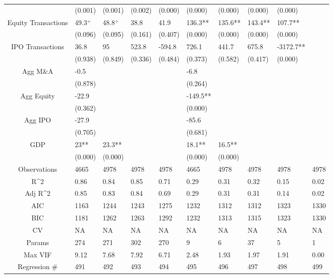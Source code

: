 \documentclass{article}
\begin{document}
\begin{table}[H]
\begin{tabular}{|clllllllll|}
   & (0.001) & (0.001) & (0.002) & (0.000) & (0.000) & (0.000) & (0.000) & (0.000) &  \\ 
  Equity Transactions & 49.3$^{+}$ & 48.8$^{+}$ & 38.8 & 41.9 & 136.3** & 135.6** & 143.4** & 107.7** &  \\ 
   & (0.096) & (0.095) & (0.161) & (0.407) & (0.000) & (0.000) & (0.000) & (0.000) &  \\ 
  IPO Transactions & 36.8 & 95 & 523.8 & -594.8 & 726.1 & 441.7 & 675.8 & -3172.7** &  \\ 
   & (0.938) & (0.849) & (0.336) & (0.484) & (0.373) & (0.582) & (0.417) & (0.000) &  \\ 
  Agg M\&A & -0.5 &  &  &  & -6.8 &  &  &  &  \\ 
   & (0.878) &  &  &  & (0.264) &  &  &  &  \\ 
  Agg Equity & -22.9 &  &  &  & -149.5** &  &  &  &  \\ 
   & (0.362) &  &  &  & (0.000) &  &  &  &  \\ 
  Agg IPO & -27.9 &  &  &  & -85.6 &  &  &  &  \\ 
   & (0.705) &  &  &  & (0.681) &  &  &  &  \\ 
  GDP & 23** & 23.3** &  &  & 18.1** & 16.5** &  &  &  \\ 
   & (0.000) & (0.000) &  &  & (0.000) & (0.000) &  &  &  \\ 
  \hline 
 Observations & 4665 & 4978 & 4978 & 4978 & 4665 & 4978 & 4978 & 4978 & 4978 \\ 
  R^2 & 0.86 & 0.84 & 0.85 & 0.71 & 0.29 & 0.31 & 0.32 & 0.15 & 0.02 \\ 
  Adj R^2 & 0.85 & 0.83 & 0.84 & 0.69 & 0.29 & 0.31 & 0.31 & 0.14 & 0.02 \\ 
  AIC & 1163 & 1244 & 1243 & 1275 & 1232 & 1312 & 1312 & 1323 & 1330 \\ 
  BIC & 1181 & 1262 & 1263 & 1292 & 1232 & 1313 & 1315 & 1323 & 1330 \\ 
  CV & NA & NA & NA & NA & NA & NA & NA & NA & NA \\ 
  Params & 274 & 271 & 302 & 270 & 9 & 6 & 37 & 5 & 1 \\ 
  Max VIF & 9.12 & 7.68 & 7.92 & 6.71 & 2.48 & 1.93 & 1.97 & 1.91 & 0.00 \\ 
  Regression \# & 491 & 492 & 493 & 494 & 495 & 496 & 497 & 498 & 499 \\ 
   \hline
\end{tabular}
 
\end{table}
\end{document}

